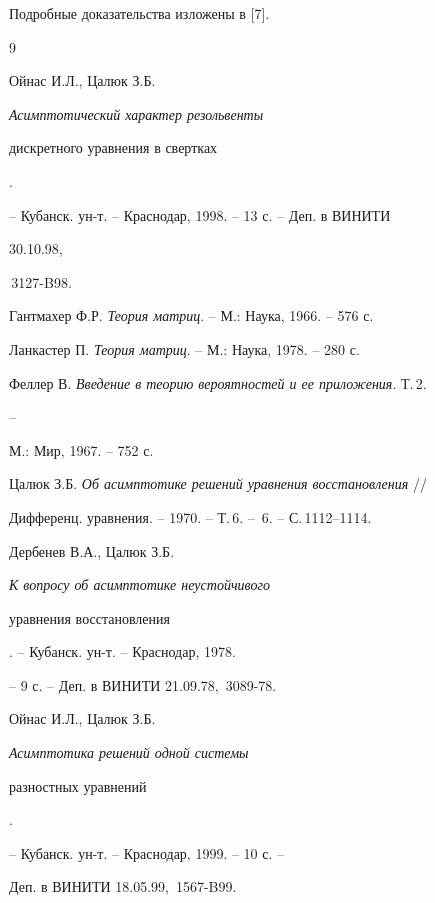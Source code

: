  


Подробные доказательства изложены в [7]. 


 


\begin{thebibliography}{9} 


 




Ойнас И.Л., Цалюк З.Б. {\em Асимптотический характер резольвенты 


дискретного уравнения в свертках}. 


-- Кубанск. ун-т. -- Краснодар, 1998. -- 13 с. -- Деп. в ВИНИТИ 


30.10.98, 


\No\,3127-B98. 




Гантмахер Ф.Р. {\em Теория матриц}. -- М.: Наука, 1966. -- 576 с. 




Ланкастер П. {\em Теория матриц}. -- М.: Наука, 1978. -- 280 с. 




Феллер В. {\em Введение в теорию вероятностей и ее приложения}. Т.\,2. 


-- 


М.: Мир, 1967. -- 752 с. 




Цалюк З.Б. {\em Об асимптотике решений уравнения восстановления} // 


Дифференц. уравнения. -- 1970. -- Т.\,6. -- \No\,6. -- С.\,1112--1114. 




Дербенев В.А., Цалюк З.Б. {\em К вопросу об асимптотике неустойчивого 


уравнения восстановления}. -- Кубанск. ун-т. -- Краснодар, 1978. 


-- 9 с. -- Деп. в ВИНИТИ 21.09.78, \No\,3089-78. 




Ойнас И.Л., Цалюк З.Б. {\em Асимптотика решений одной системы 


разностных уравнений}. 


-- Кубанск. ун-т. -- Краснодар, 1999. -- 10 с. -- 


Деп. в ВИНИТИ 18.05.99, \No\,1567-B99. 


 


\end{thebibliography} 


 


\vskip 2cm 


 








 


\label{end} 


 